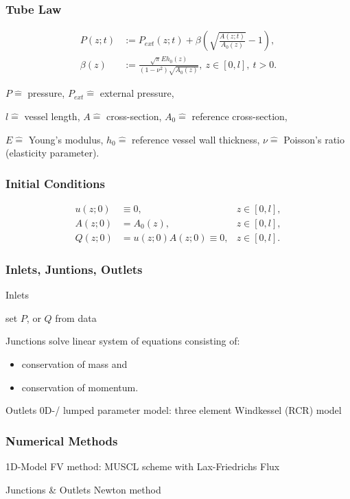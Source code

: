 \documentclass{beamer}
\begin{document}
\begin{frame}
	\frametitle{Tube Law}
	\begin{align}
		P(z;t) &:= P_{ext}(z;t) + \beta \left( \sqrt{\frac{A(z;t)}{A_0(z)}}-1 \right),      \label{eq:p_tot}\\
		\beta(z) &:=  \frac{\sqrt{\pi} E h_0(z)}{(1-\nu^2) \sqrt{A_0(z)}},\  z \in \left[ 0,l \right], \ t > 0. 
	\end{align}

	\vfill

	{\tiny \centering 
		$P \hat{=}$ pressure,
		$P_{ext} \hat{=}$ external pressure,

		$l \hat{=}$ vessel length,
		$A \hat{=}$ cross-section,
		$A_0 \hat{=}$ reference cross-section,

		$E \hat{=}$ Young's modulus,
		$h_0 \hat{=}$ reference vessel wall thickness,
		$\nu \hat{=}$ Poisson's ratio (elasticity parameter). 
	\par}

\end{frame}

\begin{frame}
	\frametitle{Initial Conditions}
	\begin{align}
		u(z;0) &\equiv 0, &z \in [0,l],\\
		A(z;0) &= A_0(z), &z \in [0,l], \\
		Q(z;0) &= u(z;0)A(z;0) \equiv 0, &z \in [0,l].
	\end{align}
	\vspace{5mm}
\end{frame}
\begin{frame}
	\frametitle{Inlets, Juntions, Outlets}
	\begin{block}{Inlets}

		set $P$, or $Q$ from data 	
	\end{block}
	\begin{block}{Junctions}
		solve linear system of equations consisting of:
		\begin{itemize}
			\item conservation of mass and
			\item conservation of momentum.
		\end{itemize}
	\end{block}
	\begin{block}{Outlets}
		0D-/ lumped parameter model: three element Windkessel (RCR) model 
	\end{block}
\end{frame}
\begin{frame}
	\frametitle{Numerical Methods}
	\begin{block}{1D-Model}
		FV method: MUSCL scheme with Lax-Friedrichs Flux
	\end{block}
	\begin{block}{Junctions \& Outlets}
		Newton method
	\end{block}


\end{frame}
\end{document}
